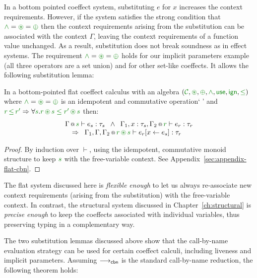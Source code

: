 In a bottom pointed coeffect system, substituting $e$ for $x$ increases the context 
requirements. However, if the system satisfies the strong condition that $\czip = \cseq = \cpar$ 
then the context requirements arising from the substitution can be associated with the context
$\Gamma$, leaving the context requirements of a function value unchanged. As a result, substitution 
does not break soundness as in effect systems. The requirement $\czip = \cseq = \cpar$ holds for 
our implicit parameters example (all three operators are a set union) and for other set-like 
coeffects. It allows the following substitution lemma:

\begin{lemma}
\label{thm:cbn-substitution-bot}
In a bottom-pointed flat coeffect calculus with an algebra $(\C, \cseq, \cpar, \czip, \cunit, \czero, \cleq)$ 
where $\czip = \cseq = \cpar$ is an idempotent and commutative operation`  ' and
$\cclrd{r}\,\cleq\,\cclrd{r'} \Rightarrow \forall\cclrd{s}.\cclrd{r}\,\cseq\,\cclrd{s}\;\cleq\;\cclrd{r'}\,\cseq\,\cclrd{s}$ then:
%
\begin{equation*}
\begin{array}{l}
\coctx{\Gamma}{\cclrd{s}} \vdash e_s : \tau_s \;\; \wedge \;\; 
\coctx{\Gamma_1,  x : \tau_s, \Gamma_2}{ \cclrd{r}  } \vdash e_r : \tau_r\\
\quad \Rightarrow \;\; \coctx{\Gamma_1,\Gamma,\Gamma_2}{ \cclrd{r} \,\cseq\, \cclrd{s} } \vdash \subst{e_r}{x}{e_s} : \tau_r
\end{array}
\end{equation*}

\end{lemma}
\begin{proof}
By induction over $\vdash$, using the idempotent, commutative monoid structure to keep $\cclrd{s}$ with
the free-variable context. See Appendix~\ref{sec:appendix-flat-cbn}.
\end{proof}

\noindent
The flat system discussed here is \emph{flexible enough} to let us always re-associate new context 
requirements (arising from the substitution) with the free-vari\-able context. In contrast, the 
structural system discussed in Chapter~\ref{ch:structural} is \emph{precise enough} to keep the 
coeffects associated with individual variables, thus preserving typing in a complementary way.

The two substitution lemmas discussed above show that the call-by-name evaluation strategy can be 
used for certain coeffect calculi, including liveness and implicit parameters. Assuming
$\longrightarrow_{\textnormal{\sffamily cbn}}$ is the standard call-by-name reduction, the following theorem holds:


